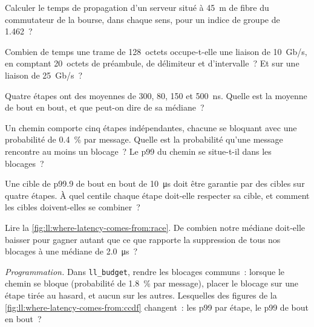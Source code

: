 \begin{exercise}[$\star$]\label{exo:ll:where-latency-comes-from:1}
Calculer le temps de propagation d'un serveur situé à 45~m de fibre du commutateur de la bourse, dans chaque sens, pour un indice de groupe de
1.462~?
\end{exercise}

\begin{exercise}[$\star$]\label{exo:ll:where-latency-comes-from:2}
Combien de temps une trame de 128~octets occupe-t-elle une liaison de 10~Gb/s, en comptant 20~octets de préambule, de délimiteur et d'intervalle~? Et sur une
liaison de 25~Gb/s~?
\end{exercise}

\begin{exercise}[$\star$]\label{exo:ll:where-latency-comes-from:3}
Quatre étapes ont des  moyennes de 300, 80, 150 et \qty{500}{\nano\second}. Quelle est la  moyenne de bout en bout, et
que peut-on dire de sa médiane~?
\end{exercise}

\begin{exercise}[$\star\star$]\label{exo:ll:where-latency-comes-from:4}
Un chemin comporte cinq étapes indépendantes, chacune se bloquant avec une probabilité de 0.4~\% par message. Quelle est la probabilité qu'une
message rencontre au moins un blocage~? Le p99 du chemin se situe-t-il dans les blocages~?
\end{exercise}

\begin{exercise}[$\star\star$]\label{exo:ll:where-latency-comes-from:5}
Une cible de p99.9 de bout en bout de \qty{10}{\micro\second} doit être garantie par des cibles sur quatre étapes. À quel
centile chaque étape doit-elle respecter sa cible, et comment les cibles doivent-elles se combiner~?
\end{exercise}

\begin{exercise}[$\star\star$]\label{exo:ll:where-latency-comes-from:6}
Lire la \cref{fig:ll:where-latency-comes-from:race}. De combien notre médiane doit-elle baisser pour gagner autant que ce que rapporte la suppression de tous nos blocages
à une médiane de \qty{2.0}{\micro\second}~?
\end{exercise}

\begin{exercise}[$\star\star\star$]\label{exo:ll:where-latency-comes-from:7}
\emph{Programmation.} Dans \texttt{ll\_budget}, rendre les blocages communs~: lorsque le chemin se bloque (probabilité de 1.8~\% par message),
placer le blocage sur une étape tirée au hasard, et aucun sur les autres. Lesquelles des figures de
la \cref{fig:ll:where-latency-comes-from:ccdf} changent~: les p99 par étape, le p99 de bout en bout~?
\end{exercise}

